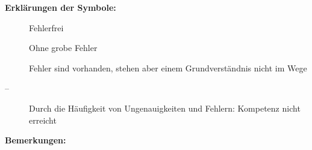 {{				\vspace{0.4em}

				\begin{minipage}{0.36\textwidth}
					\footnotesize
					\textbf{Erklärungen der Symbole:}
					\begin{description}
						\item[] Fehlerfrei
						\item[] Ohne grobe Fehler
						\item[] Fehler sind vorhanden, stehen aber einem Grundverständnis nicht im Wege
						\item[--] Durch die Häufigkeit von Ungenauigkeiten und Fehlern: Kompetenz nicht erreicht
					\end{description}
				\end{minipage}
				\begin{minipage}{0.63\textwidth}
					\textbf{Bemerkungen:}
					\kommentar
				\end{minipage}

				
			\renewcommand{\arraystretch}{1}
			\clearpage
		}
	\getNotenAuswertung
}
\renewcommand{\erwartungshorizont}{
        \IfEqCase{\schule@erwartungshorizontStil}{
            {einzeltabellen}{
                \schule@erwartungshorizontEinzeltabellen
            }%
            {simpel}{
                \schule@erwartungshorizontSimpel
            }%
						{genord}{
							\schule@erwartungshorizontGENord
						}%
        }[%
            \schule@erwartungshorizontStandard
        ]
}
\newcommand{\getNote}{%
	\ifthenelse{\boolean{schule@kmkPunkte}}{}{%
		\tikzmath{
			real \summe;
			\summe=0;
			real \gesamt;
			\gesamt = 0;
		}
		\ForEachQuestion{%
			\IfQuestionPropertyT{points}{##1}{%
				\tikzmath{\gesamt = \gesamt + \GetQuestionProperty{points}{##1};}%
			}%
			\tikzmath{\summe = \summe + \GetQuestionProperty{\krzl}{##1};}%
		}
		\tikzmath{
			real \eins;
			real \zwei;
			real \drei;
			real \vier;
			real \fuenf;
		}
		\notenschemaTikz
		\ifthenelse{\equal{\GetQuestionProperty{half}{1}}{true}}{%
			\tikzmath{%
				\eins = \eins*\gesamt;
				\zwei = \zwei*\gesamt;
				\drei = \drei*\gesamt;
				\vier = \vier*\gesamt;
				\fuenf = \fuenf*\gesamt;
			}
		}{%
			\tikzmath{%
				\eins = round(\eins*\gesamt);
				\zwei = round(\zwei*\gesamt);
				\drei = round(\drei*\gesamt);
				\vier = round(\vier*\gesamt);
				\fuenf = round(\fuenf*\gesamt);
			}
		}
		\tikzmath{
			if \summe < \fuenf then { let \note=ungenügend; }	else { 
				if \summe < \vier then { let \note=mangelhaft; } else {
					if \summe < \drei then { let \note=ausreichend; } else {
						if \summe < \zwei then { let \note=befriedigend; } else {
							if \summe < \eins then { let \note=gut;} else {
								let \note=sehr gut;
							};
						};
					};
				};
			};
		}
		\note
	}
}
